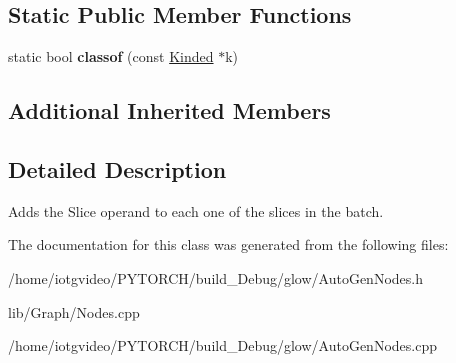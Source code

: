 \subsection*{Static Public Member Functions}
\begin{DoxyCompactItemize}
\item 
\mbox{\label{classglow_1_1_batched_add_node_a77abe43f23cac28574d4986f7d982e77}} 
static bool {\bfseries classof} (const \hyperlink{classglow_1_1_kinded}{Kinded} $\ast$k)
\end{DoxyCompactItemize}
\subsection*{Additional Inherited Members}


\subsection{Detailed Description}
Adds the \textquotesingle{}Slice\textquotesingle{} operand to each one of the slices in the batch. 

The documentation for this class was generated from the following files\+:\begin{DoxyCompactItemize}
\item 
/home/iotgvideo/\+P\+Y\+T\+O\+R\+C\+H/build\+\_\+\+Debug/glow/Auto\+Gen\+Nodes.\+h\item 
lib/\+Graph/Nodes.\+cpp\item 
/home/iotgvideo/\+P\+Y\+T\+O\+R\+C\+H/build\+\_\+\+Debug/glow/Auto\+Gen\+Nodes.\+cpp\end{DoxyCompactItemize}
